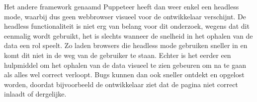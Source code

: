 Het andere framework genaamd Puppeteer heeft dan weer enkel een headless mode, waarbij dus geen webbrowser visueel voor de ontwikkelaar verschijnt.
De headless functionaliteit is niet erg van belang voor dit onderzoek, wegens dat dit eenmalig wordt gebruikt, het is slechts wanneer de snelheid in het ophalen van de data een rol speelt. Zo laden browsers die headless mode gebruiken sneller in en komt dit niet in de weg van de gebruiker te staan. Echter is het eerder een hulpmiddel om het ophalen van de data visueel te zien gebeuren om na te gaan als alles wel correct verloopt. Bugs kunnen dan ook sneller ontdekt en opgelost worden, doordat bijvoorbeeld de ontwikkelaar ziet dat de pagina niet correct inlaadt of dergelijke.

